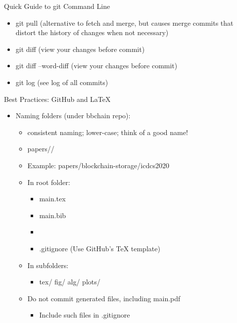 \documentclass[hyperref={pdfpagelabels=false}, aspectratio=1610]{beamer}
\begin{document}
\begin{frame}
\begin{block}{Quick Guide to git Command Line}
 \begin{itemize}
  \item git pull \quad (alternative to fetch and merge, but causes merge commits that distort the history of changes when not necessary)
  \item git diff \quad (view your changes before commit)
  \item git diff --word-diff \quad (view your changes before commit)
  \item git log \quad (see log of all commits)
 \end{itemize}
\end{block}
\end{frame}


\begin{frame}
\begin{block}{Best Practices: GitHub and LaTeX}
 \begin{itemize}
  \item Naming folders (under bbchain repo):
  \begin{itemize}
  	\item consistent naming; lower-case; think of a good name!
	\item papers//
	\item Example: papers/blockchain-storage/icdcs2020
  \end{itemize}
  \begin{itemize}
  	\item In root folder:
	\begin{itemize}
		\item main.tex
		\item main.bib
		\item {}
		\item .gitignore \quad (Use GitHub's TeX template)
	\end{itemize}
	\item In subfolders:
	\begin{itemize}
		\item tex/ \quad fig/ \quad alg/ \quad plots/
	\end{itemize}
	\item Do not commit generated files, including main.pdf
	\begin{itemize}
		\item Include such files in .gitignore
	\end{itemize}
  \end{itemize}
  \end{itemize}
\end{block}
\end{frame}
\end{document}
